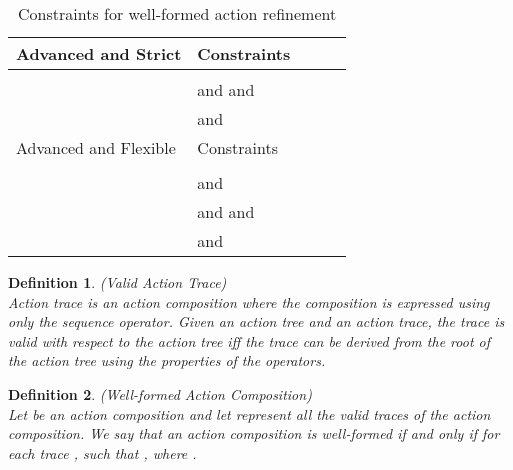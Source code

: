 \documentclass[12pt,journal,letterpaper,onecolumn]{IEEEtran}
\newtheorem{definition}{Definition}[section]
\begin{document}
\begin{table}[h]
\begin{center}
\begin{minipage}{6in}
\begin{center}
\begin{tabular}{|p{3.2cm}|llll|}
\hline \hline
Advanced and Strict & Constraints &&& \\
\hline


 &

 & 
&
 &\\

& \multicolumn{3}{l}{
   and  and } &\\

& \multicolumn{3}{l}{
  and } &\\



\hline
\hline Advanced and Flexible & Constraints &&& \\
\hline


 &





 &  && \\

 &\multicolumn{3}{l}{ and
  } & \\


 &\multicolumn{3}{l}{ and  and } & \\


&\multicolumn{3}{l}{ and  } & \\


 \hline
\end{tabular}
\end{center}
\normalsize
\end{minipage}
\caption{Constraints for well-formed action refinement}
\label{table:refine}
\end{center}
\end{table}



\begin{definition}(Valid Action Trace)\\
Action trace is an action composition where the composition is
expressed using only the sequence operator. Given an action tree and
an action trace, the trace is valid with respect to the action tree
iff the trace can be derived from the root of the action tree using
the properties of the operators.
\end{definition}

\begin{definition}(Well-formed Action Composition)\\
Let  be an action composition and let
 represent all the valid traces of the action
composition. We say that an action composition is well-formed if and
only if for each trace ,  such
that , where .
\label{def:well-formed}
\end{definition}
\end{document}
